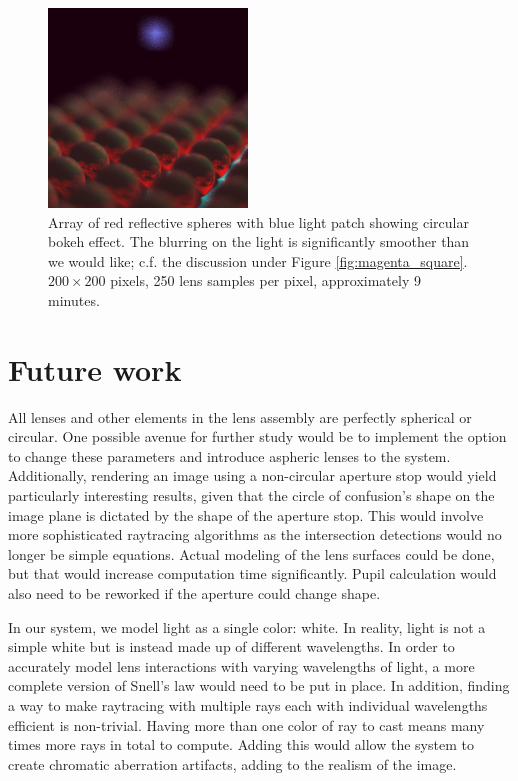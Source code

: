 \documentclass[twocolumn]{article}
\begin{document}
\begin{figure}[h]
    \centering
    \includegraphics[scale=1.0]{img/red_sphere_array_lights_correct.png}
    \caption{Array of red reflective spheres with blue light patch showing circular
    bokeh effect. The blurring on the light is significantly smoother than we
    would like; c.f. the discussion under Figure \ref{fig:magenta_square}.
    $200\times 200$ pixels, 250 lens samples per pixel, approximately 9 minutes.}
    \label{fig:red_sphere_array_lights_correct}
\end{figure}

\section{Future work}
All lenses and other elements in the lens assembly are perfectly spherical or circular.
One possible avenue for further study would be to implement the option to change these
parameters and introduce aspheric lenses to the system. Additionally, rendering an
image using a non-circular aperture stop would yield particularly interesting results,
given that the circle of confusion's shape on the image plane is dictated by the shape
of the aperture stop. This would involve more sophisticated raytracing algorithms as
the intersection detections would no longer be simple equations. Actual modeling of the
lens surfaces could be done, but that would increase computation time significantly.
Pupil calculation would also need to be reworked if the aperture could change shape.

In our system, we model light as a single color: white. In reality, light is not a simple
white but is instead made up of different wavelengths. In order to accurately model lens
interactions with varying wavelengths of light, a more complete version of Snell's law
would need to be put in place. In addition, finding a way to make raytracing with multiple
rays each with individual wavelengths efficient is non-trivial. Having more than one color
of ray to cast means many times more rays in total to compute. Adding this would allow
the system to create chromatic aberration artifacts, adding to the realism of the image.
\end{document}
